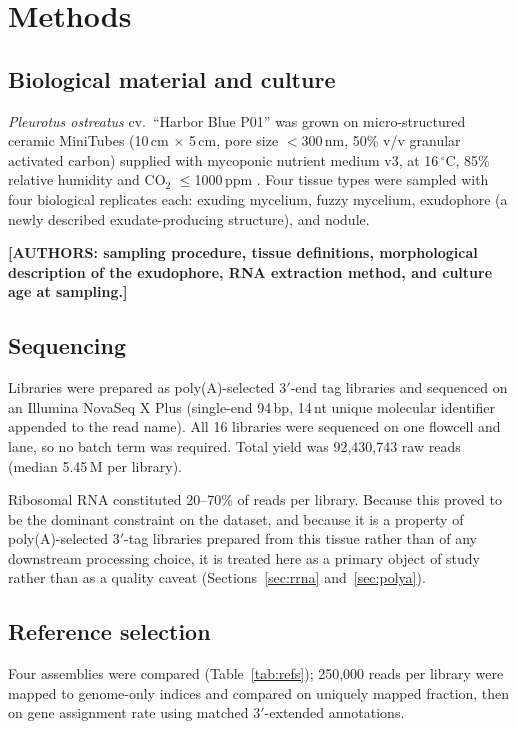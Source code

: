 \section{Methods}

\subsection{Biological material and culture}
\textit{Pleurotus ostreatus} cv.\ ``Harbor Blue P01'' was grown on micro-structured ceramic
MiniTubes (10\,cm $\times$ 5\,cm, pore size $<$300\,nm, 50\% v/v granular activated carbon)
supplied with mycoponic nutrient medium v3, at 16\,$^\circ$C, 85\% relative humidity and
CO$_2$ $\leq$1000\,ppm \cite{porterfield2026mycoponics}. Four tissue types were sampled with
four biological replicates each: exuding mycelium, fuzzy mycelium, exudophore (a newly
described exudate-producing structure), and nodule.

\noindent\textbf{[AUTHORS: sampling procedure, tissue definitions, morphological description
of the exudophore, RNA extraction method, and culture age at sampling.]}

\subsection{Sequencing}
Libraries were prepared as poly(A)-selected 3$'$-end tag libraries and sequenced on an
Illumina NovaSeq X Plus (single-end 94\,bp, 14\,nt unique molecular identifier appended to the
read name). All 16 libraries were sequenced on one flowcell and lane, so no batch term was
required. Total yield was 92,430,743 raw reads (median 5.45\,M per library).

Ribosomal RNA constituted 20--70\% of reads per library. Because this proved to be the
dominant constraint on the dataset, and because it is a property of poly(A)-selected 3$'$-tag
libraries prepared from this tissue rather than of any downstream processing choice, it is
treated here as a primary object of study rather than as a quality caveat
(Sections~\ref{sec:rrna} and~\ref{sec:polya}).

\subsection{Reference selection}
Four assemblies were compared (Table~\ref{tab:refs}); 250,000 reads per library were mapped to
genome-only indices and compared on uniquely mapped fraction, then on gene assignment rate
using matched 3$'$-extended annotations.

